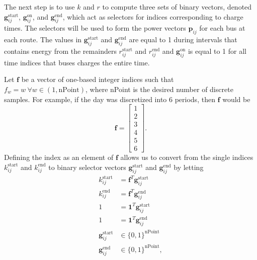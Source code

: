 The next step is to use $k$ and $r$ to compute three sets of binary vectors, denoted $\mathbf{g}^{\text{start}}_{ij}$, $\mathbf{g}^{\text{on}}_{ij}$, and $\mathbf{g}^{\text{end}}_{ij}$, which act as selectors for indices corresponding to charge times. The selectors will be used to form the power vectors $\mathbf{p}_{ij}$ for each bus at each route. The values in $\mathbf{g}_{ij}^{\text{start}}$ and $\mathbf{g}_{ij}^{\text{end}}$ are equal to 1 during intervals that contains energy from the remainders $r_{ij}^{\text{start}}$ and $r_{ij}^{\text{end}}$ and $\mathbf{g}_{ij}^{\text{on}}$ is equal to 1 for all time indices that buses charges the entire time. 
\par Let $\mathbf{f}$ be a vector of one-based integer indices such that $f_w = w \ \forall w \in (1,\text{nPoint})$, where nPoint is the desired number of discrete samples. For example, if the day was discretized into $6$ periods, then $\mathbf{f}$ would be 
\begin{equation}
	\mathbf{f} = \begin{bmatrix}1 \\ 2 \\ 3 \\ 4 \\ 5 \\ 6 \end{bmatrix}.
\end{equation}
Defining the index as an element of $\mathbf{f}$ allows us to convert from the single indices $k_{ij}^{\text{start}}$ and $k_{ij}^{\text{end}}$ to binary selector vectors  $\mathbf{g}_{ij}^{\text{start}}$ and $\mathbf{g}_{ij}^{\text{end}}$ by letting 
\begin{equation}\label{eqn:idxStart}\begin{aligned}
	k^{\text{start}}_{ij}        &= \mathbf{f}^T\mathbf{g}^{\text{start}}_{ij} \\
	k^{\text{end}}_{ij}         &= \mathbf{f}^T\mathbf{g}^{\text{end}}_{ij}  \\ 
	1                            &= \mathbf{1}^T\mathbf{g}^{\text{start}}_{ij} \\
	1                            &= \mathbf{1}^T\mathbf{g}^{\text{end}}_{ij}  \\
	\mathbf{g}^{\text{start}}_{ij}  &\in \{0,1\}^{\text{nPoint}}                \\
	\mathbf{g}^{\text{end}}_{ij} &\in \{0,1\}^{\text{nPoint}},
\end{aligned} \end{equation}

